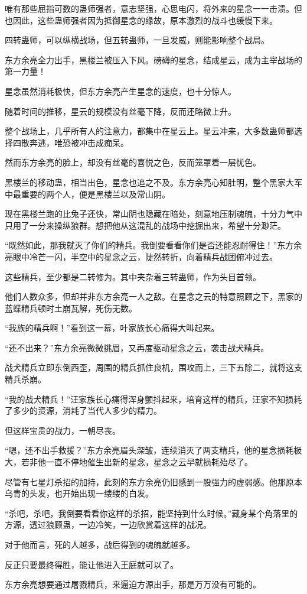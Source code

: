 \begin{this_body}
唯有那些屈指可数的蛊师强者，意志坚强，心思电闪，将外来的星念一一击溃。但也因此，这些蛊师强者因为抵御星念的缘故，原本激烈的战斗也缓慢下来。

四转蛊师，可以纵横战场，但五转蛊师，一旦发威，则能影响整个战局。

东方余亮全力出手，黑楼兰被压入下风。磅礴的星念，结成星云，成为主宰战场的第一力量！

星念虽然消耗极快，但东方余亮产生星念的速度，也十分惊人。

随着时间的推移，星云的规模没有丝毫下降，反而还略微上升。

整个战场上，几乎所有人的注意力，都集中在星云上。星云冲来，大多数蛊师都选择四散奔逃，唯恐被冲击成痴呆。

然而东方余亮的脸上，却没有丝毫的喜悦之色，反而笼罩着一层忧色。

黑楼兰的移动蛊，相当出色，星念也追之不及。东方余亮心知肚明，整个黑家大军中最重要的两个人，便是黑楼兰以及常山阴。

现在黑楼兰跑的比兔子还快，常山阴也隐藏在暗处，刻意地压制魂魄，十分力气中只用了一分来操纵狼群。想把他从这混乱的战场中挖掘出来，希望十分渺茫。

“既然如此，那我就灭了你们的精兵。我倒要看看你们是否还能忍耐得住！”东方余亮眼中冷芒一闪，半空中的星念之云，陡然转折，向着精兵战团俯冲过去。

这些精兵，至少都是二转修为。其中夹杂着三转蛊师，作为头目首领。

他们人数众多，但却并非东方余亮一人之敌。在星念之云的特意照顾之下，黑家的蓝蝶精兵顿时土崩瓦解，死伤无数。

“我族的精兵啊！”看到这一幕，叶家族长心痛得大叫起来。

“还不出来？”东方余亮微微挑眉，又再度驱动星念之云，袭击战犬精兵。

战犬精兵立即东倒西歪，周围的精兵抓住良机，围攻而上，三下五除二，就将这支精兵杀崩。

“我的战犬精兵！”汪家族长心痛得浑身颤抖起来，培育这样的精兵，汪家不知损耗了多少的资源，消耗了当代人多少的精力。

但这样宝贵的战力，一朝尽丧。

“嗯，还不出手救援？”东方余亮眉头深皱，连续消灭了两支精兵，他的星念损耗极大，若非他一直不停地催生出新的星念，星念之云早就损耗殆尽了。

尽管有七星灯杀招的加持，此刻的东方余亮仍旧感到一股强力的虚弱感。他那原本乌青的头发，也开始出现一缕缕的白发。

“杀吧，杀吧，我倒要看看你这样的杀招，能坚持到什么时候。”藏身某个角落里的方源，透过狼顾蛊，一边冷笑，一边欣赏着这样的战况。

对于他而言，死的人越多，战后得到的魂魄就越多。

反正只要最终得胜，能让他进入王庭就可以了。

东方余亮想要通过屠戮精兵，来逼迫方源出手，那是万万没有可能的。

\end{this_body}

